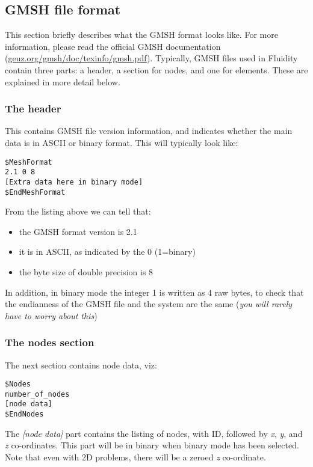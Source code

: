\subsection{GMSH file format}\label{sect:gmsh_file_format}

This section briefly describes what the GMSH format looks like. For more information, please read the official GMSH documentation (\href{http://geuz.org/gmsh/doc/texinfo/gmsh.pdf}{geuz.org/gmsh/doc/texinfo/gmsh.pdf}). Typically, GMSH files used in Fluidity contain three parts: a header, a section for nodes, and one for elements. These are explained in more detail below.



\subsubsection*{The header}\label{sect:gmsh_header_section}
This contains GMSH file version information, and indicates whether the main data is in ASCII or binary format. This will typically look like:
\begin{lstlisting}
$MeshFormat
2.1 0 8
[Extra data here in binary mode]
$EndMeshFormat
\end{lstlisting}

From the listing above we can tell that:
\begin{itemize}
\item the GMSH format version is 2.1
\item it is in ASCII, as indicated by the 0 (1=binary)
\item the byte size of double precision is 8
\end{itemize}
In addition, in binary mode the integer 1 is written as 4 raw bytes, to check that the endianness of the GMSH file and the system are the same (\textit{you will rarely have to worry about this})



\subsubsection*{The nodes section}\label{sect:gmsh_nodes_section}

The next section contains node data, viz:
\begin{lstlisting}
$Nodes
number_of_nodes
[node data]
$EndNodes
\end{lstlisting}

The \textit{[node data]} part contains the listing of nodes, with ID, followed by \textit{x}, \textit{y}, and \textit{z} co-ordinates. This part will be in binary when binary mode has been selected. Note that even with 2D problems, there will be a zeroed \textit{z} co-ordinate.



